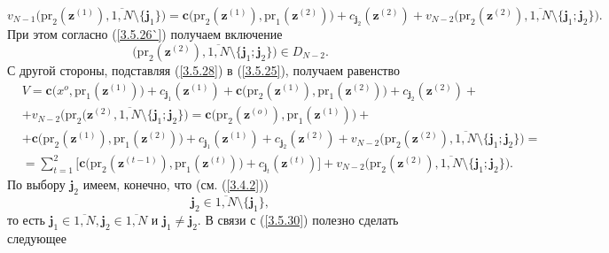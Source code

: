 \documentclass[12pt,twoside]{report}
\newcommand{\bfn}{\begin{equation}}
\newcommand{\efn}{\end{equation}}
\newcommand{\ov}{\overline}
\newcommand{\sm}{\setminus}
\begin{document}
{\bfn\label{3.5.28}
v_{N-1}\bigl(\mathrm{pr}_2(\mathbf{z}^{(1)}),\ov{1,N}\sm\{\mathbf{j}_1\}\bigl) =
\mathbf{c}\bigl(\mathrm{pr}_2(\mathbf{z}^{(1)}),\mathrm{pr}_1(\mathbf{z}^{(2)})) +
c_{\mathbf{j}_2}(\mathbf{z}^{(2)}) + v_{N-2}\bigl(\mathrm{pr}_2(\mathbf{z}^{(2)}),
\ov{1,N}\sm\{\mathbf{j}_1;\mathbf{j}_2\}\bigl).
\efn
При этом согласно (\ref{3.5.26`}) получаем включение
\bfn\label{3.5.28}
\bigl(\mathrm{pr}_2(\mathbf{z}^{(2)}),\ov{1,N}\sm\{\mathbf{j}_1;\mathbf{j}_2\}\bigl)\in D_{N-2}.
\efn
С другой стороны, подставляя  (\ref{3.5.28}) в (\ref{3.5.25}), получаем равенство
\begin{eqnarray}
&V = \mathbf{c}\bigl(x^o,\mathrm{pr}_1(\mathbf{z}^{(1)})\bigl) +
c_{\mathbf{j}_1}(\mathbf{z}^{(1)}) + \mathbf{c}\bigl(\mathrm{pr}_2(\mathbf{z}^{(1)}),
\mathrm{pr}_1(\mathbf{z}^{(2)})\bigl) + c_{\mathbf{j}_2}(\mathbf{z}^{(2)}) +
&\nonumber\\
&+v_{N-2}\bigl(\mathrm{pr}_2(\mathbf{z}^{(2)},\ov{1,N}\sm\{\mathbf{j}_1;\mathbf{j}_2\}\bigl) =
\mathbf{c}\bigl(\mathrm{pr}_2(\mathbf{z}^{(o)}),\mathrm{pr}_1(\mathbf{z}^{(1)})\bigl) +
&\nonumber\\
&+ \mathbf{c}\bigl(\mathrm{pr}_2(\mathbf{z}^{(1)}),\mathrm{pr}_1(\mathbf{z}^{(2)})\bigl) +
c_{\mathbf{j}_1}(\mathbf{z}^{(1)}) + c_{\mathbf{j}_2}(\mathbf{z}^{(2)}) +
v_{N-2}\bigl(\mathrm{pr}_2(\mathbf{z}^{(2)}),\ov{1,N}\sm\{\mathbf{j}_1;\mathbf{j}_2\}\bigl) =
&\nonumber\\
&= \sum\limits_{t=1}^2 \bigl[\mathbf{c}\bigl(\mathrm{pr}_2(\mathbf{z}^{(t-1)}),
\mathrm{pr}_1(\mathbf{z}^{(t)})\bigl) + c_{\mathbf{j}_t}(\mathbf{z}^{(t)})\bigl] +
v_{N-2}\bigl(\mathrm{pr}_2(\mathbf{z}^{(2)}),\ov{1,N}\sm\{\mathbf{j}_1;\mathbf{j}_2\}\bigl).
&\label{3.5.30}
\end{eqnarray}
По выбору $\mathbf{j}_2$ имеем, конечно, что (см. (\ref{3.4.2}))
\bfn\label{3.5.31`}\mathbf{j}_2 \in \ov{1,N}\sm\{\mathbf{j}_1\},
\efn
то есть $\mathbf{j}_1\in \ov{1,N}, \mathbf{j}_2\in \ov{1,N}$ и $\mathbf{j}_1 \neq
\mathbf{j}_2.$ В связи с (\ref{3.5.30}) полезно сделать следующее

}
\end{document}
